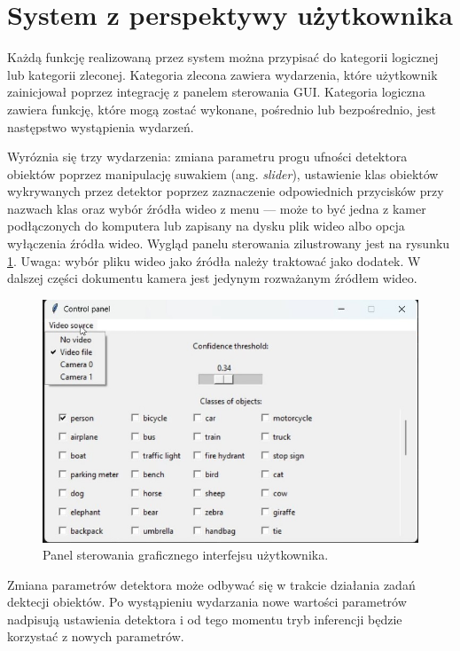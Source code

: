 \section{System z perspektywy użytkownika}
\label{chap:uzytkownik-gui}
Każdą funkcję realizowaną przez system można przypisać do kategorii logicznej lub kategorii zleconej. Kategoria zlecona zawiera wydarzenia, które użytkownik zainicjował poprzez integrację z panelem sterowania GUI. Kategoria logiczna zawiera funkcję, które mogą zostać wykonane, pośrednio lub bezpośrednio, jest następstwo wystąpienia wydarzeń.

Wyróznia się trzy wydarzenia: zmiana parametru progu ufności detektora obiektów poprzez manipulację suwakiem (ang. \emph{slider}), ustawienie klas obiektów wykrywanych przez detektor poprzez zaznaczenie odpowiednich przycisków przy nazwach klas oraz wybór źródła wideo z menu --- może to być jedna z kamer podłączonych do komputera lub zapisany na dysku plik wideo albo opcja wyłączenia źródła wideo. Wygląd panelu sterowania zilustrowany jest na rysunku \ref{fig:panel-sterowania}. 
Uwaga: wybór pliku wideo jako źródła należy traktować jako dodatek. W dalszej części dokumentu kamera jest jedynym rozważanym źródłem wideo.   

\begin{figure}[H]
    \centering
    \includegraphics[width=0.79\linewidth]{r_implementacja/panel_sterowania/panel.jpg}
    \caption{Panel sterowania graficznego interfejsu użytkownika.}
    \label{fig:panel-sterowania}
\end{figure}

Zmiana parametrów detektora może odbywać się w trakcie działania zadań dektecji obiektów. Po wystąpieniu wydarzania nowe wartości parametrów nadpisują ustawienia detektora i od tego momentu tryb inferencji będzie korzystać z nowych parametrów.

